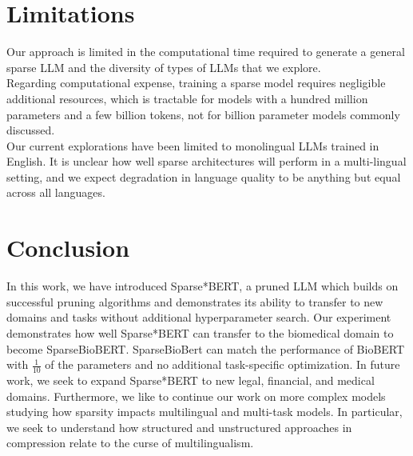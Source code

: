\section{Limitations}
Our approach is limited in the computational time required to generate a general sparse LLM and the diversity of types of LLMs that we explore. \\
Regarding computational expense, training a sparse model requires negligible additional resources, which is tractable for models with a hundred million parameters and a few billion tokens, not for billion parameter models commonly discussed. \\
Our current explorations have been limited to monolingual LLMs trained in English. It is unclear how well sparse architectures will perform in a multi-lingual setting, and we expect degradation in language quality to be anything but equal across all languages. \\
\section{Conclusion}
In this work, we have introduced Sparse*BERT, a pruned LLM which builds on successful pruning algorithms and demonstrates its ability to transfer to new domains and tasks without additional hyperparameter search. Our experiment demonstrates how well Sparse*BERT can transfer to the biomedical domain to become SparseBioBERT. SparseBioBert can match the performance of BioBERT with $\frac{1}{10}$ of the parameters and no additional task-specific optimization. 
In future work, we seek to expand Sparse*BERT to new legal, financial, and medical domains. Furthermore, we like to continue our work on more complex models studying how sparsity impacts multilingual and multi-task models. In particular, we seek to understand how structured and unstructured approaches in compression relate to the curse of multilingualism.



